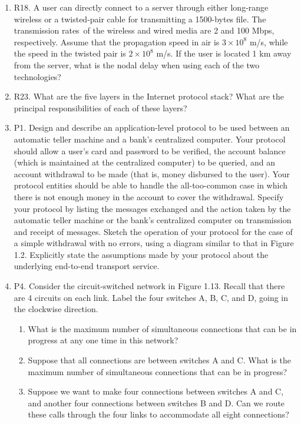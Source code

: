 \documentclass[12pt]{article}
\begin{document}
\begin{enumerate}
\item R18.  A user can directly connect to a server through either long-range wireless or a twisted-pair cable for transmitting a 1500-bytes file. The transmission rates of the wireless and wired media are 2 and 100 Mbps, respectively. Assume that the propagation speed in air is \(3 \times 10^8\) m/s, while the speed in the twisted pair is \(2 \times 10^8\) m/s. If the user is located 1 km away from the server, what is the nodal delay when using each of the two technologies?

\item R23.  What are the five layers in the Internet protocol stack? What are the principal responsibilities of each of these layers?

\item P1.  Design and describe an application-level protocol to be used between an automatic teller machine and a bank’s centralized computer. Your protocol should allow a user’s card and password to be verified, the account balance (which is maintained at the centralized computer) to be queried, and an account withdrawal to be made (that is, money disbursed to the user). Your protocol entities should be able to handle the all-too-common case in which there is not enough money in the account to cover the withdrawal. Specify your protocol by listing the messages exchanged and the action taken by the automatic teller machine or the bank’s centralized computer on transmission and receipt of messages. Sketch the operation of your protocol for the case of a simple withdrawal with no errors, using a diagram similar to that in Figure 1.2. Explicitly state the assumptions made by your protocol about the underlying end-to-end transport service.

\item P4.  Consider the circuit-switched network in Figure 1.13. Recall that there are 4 circuits on each link. Label the four switches A, B, C, and D, going in the clockwise direction.
    \begin{enumerate}
        \item What is the maximum number of simultaneous connections that can be in progress at any one time in this network?
        \item Suppose that all connections are between switches A and C. What is the maximum number of simultaneous connections that can be in progress?
        \item Suppose we want to make four connections between switches A and C, and another four connections between switches B and D. Can we route these calls through the four links to accommodate all eight connections?
    \end{enumerate}


\end{enumerate}
\end{document}
